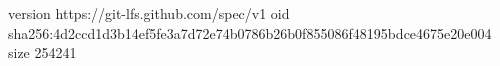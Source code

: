 version https://git-lfs.github.com/spec/v1
oid sha256:4d2ccd1d3b14ef5fe3a7d72e74b0786b26b0f855086f48195bdce4675e20e004
size 254241
